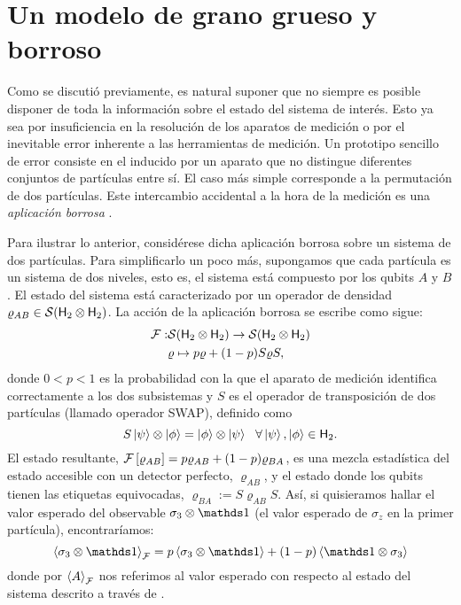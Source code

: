 \section{Un modelo de grano grueso y borroso}\label{sec:CH2CG}


Como se discutió previamente, es natural suponer que no siempre es posible disponer de toda la información sobre el estado
 del sistema de interés. Esto ya sea por insuficiencia en la resolución de los aparatos de medición o por el inevitable error inherente a las herramientas de medición. Un prototipo sencillo de error consiste en el inducido por un aparato que no distingue diferentes conjuntos de partículas entre sí. El caso más simple corresponde a la permutación de dos partículas. Este intercambio accidental a la hora de la medición es una \textit{aplicación borrosa} \cite{FuzzyMeasurements}.

Para ilustrar lo anterior, considérese dicha aplicación borrosa sobre un sistema de dos partículas. Para simplificarlo un poco más, supongamos que cada partícula es un sistema de dos niveles, esto es, el sistema está compuesto por los qubits $A$ y $B$. El estado del sistema está caracterizado por un operador de densidad $\varrho_{AB} \in \mathcal{S}({\sf H}_2 \otimes {\sf H}_2)$. La acción de la aplicación borrosa se escribe como sigue:
\begin{align}
\mathcal{F}:&\mathcal{S}({\sf H}_2 \otimes {\sf H}_2)\to \mathcal{S}({\sf H}_2 \otimes {\sf H}_2)\nonumber\\
&\varrho \mapsto p\varrho+(1-p)S\varrho S,\nonumber
\end{align}
donde $0<p<1$ es la probabilidad con la que el aparato de medición identifica correctamente  a los dos subsistemas y $S$ es el operador de transposición de dos partículas (llamado operador SWAP), definido como 
\begin{equation}
    S\ket{\psi}\otimes \ket{\phi}=\ket{\phi}\otimes \ket{\psi} \ \ \forall \ket{\psi},\ket{\phi}\in {\sf H}_2.\nonumber
\end{equation}
El estado resultante, $\mathcal{F}\left[\varrho_{AB}\right]=p\varrho_{AB}+(1-p)\varrho_{BA}$, es una mezcla estadística del estado accesible con un detector perfecto, $\varrho_{AB}$, y el estado donde los qubits tienen las etiquetas equivocadas, $\varrho_{BA}:=S\varrho_{AB} S$. Así, si quisieramos hallar el valor esperado del observable $\sigma_{3}\otimes\Id$ (el valor esperado de $\sigma_{z}$ en la primer partícula), encontraríamos:
\begin{equation}
    \expval{\sigma_{3}\otimes\Id}_{\mcF}=p\expval{\sigma_{3}\otimes\Id}+(1-p)\expval{\Id\otimes\sigma_{3}}\nonumber
\end{equation}
donde por $\expval{A}_{\mathcal{F}}$ nos referimos al valor esperado con respecto al estado del sistema descrito a través de .

